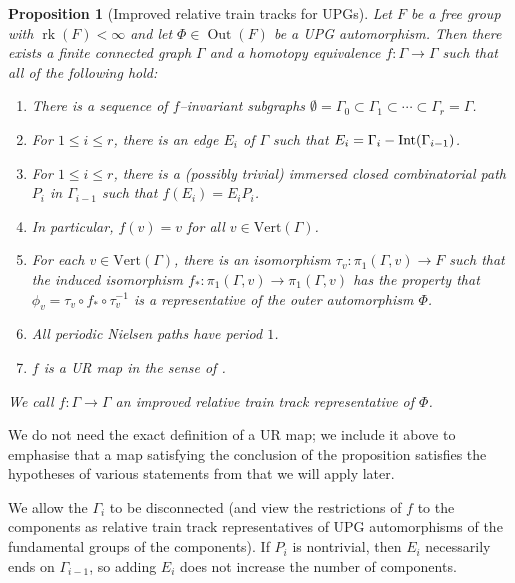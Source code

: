 \documentclass[11pt,oneside]{amsart}
\newtheorem{prop}[thm]{Proposition}
\theoremstyle{definition}
\DeclareMathOperator{\rank}{rk}
\DeclareMathOperator{\Out}{Out}
\newcommand{\interior} [1] {{\ensuremath \text{\rm Int}(#1) }}
\newcommand{\vertices}{\mathrm{Vert}}
\begin{document}
\begin{prop}[Improved relative train tracks for UPGs]\label{prop:basic-rttm}
Let $F$ be a free group with $\rank(F)<\infty$ and let $\Phi\in \Out(F)$ be a 
UPG automorphism.  Then there exists a finite connected graph 
$\Gamma$ and a homotopy equivalence $f:\Gamma\to\Gamma$ such that all of the 
following hold:
\begin{enumerate}
 \item There is a sequence of $f$--invariant subgraphs 
$\emptyset=\Gamma_0\subset 
\Gamma_1\subset\cdots\subset\Gamma_r=\Gamma$.\label{item:filtration}

\item For $1\leq i\leq r$, there is an edge $E_i$ of $\Gamma$ such that 
$E_i=\Gamma_i-\interior{\Gamma_{i-1}}$.

\item For $1\leq i\leq r$, there is a (possibly trivial) immersed closed 
combinatorial path $P_i$ in $\Gamma_{i-1}$ such that $f(E_i)=E_iP_i$. 
\label{item:edge-image}

\item \label{item:vertex-preserved}  In particular, $f(v)=v$ for all $v\in 
\vertices(\Gamma)$.

\item For each $v\in\vertices(\Gamma)$, there is an isomorphism 
$\tau_v:\pi_1(\Gamma,v)\to F$ such that the induced isomorphism 
$f_*:\pi_1(\Gamma,v)\to\pi_1(\Gamma,v)$ has the property that 
$\phi_v=\tau_v\circ f_*\circ\tau_v^{-1}$ is a representative of the outer 
automorphism $\Phi$.

\item All periodic Nielsen paths have period $1$.

\item $f$ is a \emph{UR map} in the sense of \cite[Def. 3.13]{BFH:kolchin}.
\end{enumerate}
We call $f:\Gamma\to\Gamma$ an \emph{improved relative train track 
representative} of $\Phi$.
\end{prop}

We do not need the exact definition of a UR map; we include it above to emphasise that a map satisfying the conclusion of the proposition satisfies the hypotheses of various statements from \cite{BFH:kolchin} that we will apply later.

We allow the $\Gamma_i$ to be disconnected (and view the restrictions of $f$ to the components as relative train track representatives of UPG automorphisms of the fundamental groups of the components).  If $P_i$ is nontrivial, then $E_i$ necessarily ends on $\Gamma_{i-1}$, so adding $E_i$ does not increase the number of components.
\end{document}
